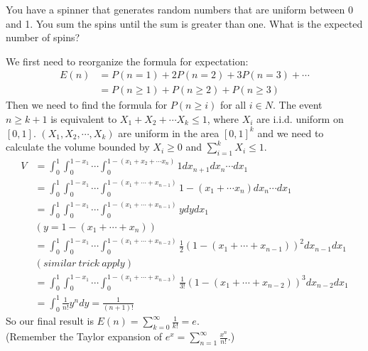 \begin{exe}
You have a spinner that generates random numbers that are uniform between 0 and 1. You sum the spins until the sum is greater than one. What is the expected number of spins?
\end{exe}
\begin{teacher}
\begin{sol}
We first need to reorganize the formula for expectation:\\
\begin{align*}
E(n) &= P(n=1) +2P(n=2) +3P(n=3)+\cdots \\
&=P(n\geq1) + P(n\geq 2) +P(n\geq3)
\end{align*}
Then we need to find the formula for $P(n\geq i)$ for all $i \in N$. The event $n\geq k+1$ is equivalent to $X_1+X_2+\cdots X_{k}\leq 1$, where $X_i$ are i.i.d. uniform on $[0,1]$. $(X_1, X_2, \cdots, X_k)$ are uniform in the area $[0,1]^k$ and we need to calculate the volume bounded by $X_i\geq 0$ and $\sum\limits_{i=1}^k X_i \leq 1$.
\begin{align*}
    V &=\int_0^1\int_0^{1-x_1}\cdots \int_0^{1-(x_1+x_2+\cdots x_n)} 1dx_{n+1}dx_n \cdots dx_1\\
    &=\int_0^1\int_0^{1-x_1}\cdots \int_0^{1-(x_1+\cdots +x_{n-1})}1-(x_1+\cdots x_n)dx_n\cdots dx_1\\
    &= \int_0^1\int_0^{1-x_1}\cdots \int_0^{1-(x_1+\cdots+x_{n-1})}ydydx_1\\
    & (y=1-(x_1+ \cdots +x_n)) \\
    &=\int_0^1\int_0^{1-x_1}\cdots \int_0^{1-(x_1+\cdots+x_{n-2})}\frac{1}{2}(1-(x_1+\cdots+x_{n-1}))^2dx_{n-1} dx_1\\
    &(similar\ trick\ apply)\\
    &=\int_0^1\int_0^{1-x_1}\cdots \int_0^{1-(x_1+\cdots+x_{n-3})}\frac{1}{3!}(1-(x_1+\cdots+x_{n-2}))^3dx_{n-2} dx_1\\
    &=\int_0^1 \frac{1}{n!}y^ndy = \frac{1}{(n+1)!}
\end{align*}
So our final result is $E(n)=\sum\limits_{k=0}^{\infty} \frac{1}{k!}=e$. \\
(Remember the Taylor expansion of $e^x = \sum\limits_{n=1}^{\infty} \frac{x^n}{n!}$.)
\end{sol}
\end{teacher}

